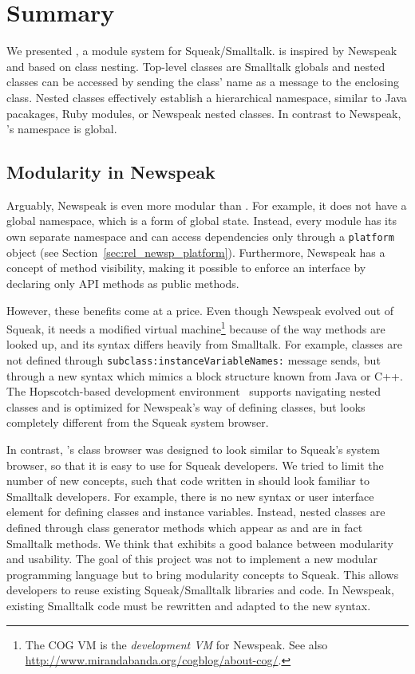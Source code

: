 \chapter{Summary}
\label{sec:summary}
We presented \msname, a module system for Squeak/Smalltalk. \msname is inspired by Newspeak and based on class nesting. Top-level classes are Smalltalk globals and nested classes can be accessed by sending the class' name as a message to the enclosing class. Nested classes effectively establish a hierarchical namespace, similar to Java pacakages, Ruby modules, or Newspeak nested classes. In contrast to Newspeak, \msname's namespace is global.

\section{Modularity in Newspeak}
Arguably, Newspeak is even more modular than \msname. For example, it does not have a global namespace, which is a form of global state. Instead, every module has its own separate namespace and can access dependencies only through a \texttt{platform} object (see Section~\ref{sec:rel_newsp_platform}). Furthermore, Newspeak has a concept of method visibility, making it possible to enforce an interface by declaring only API methods as public methods. 

However, these benefits come at a price. Even though Newspeak evolved out of Squeak, it needs a modified virtual machine\footnote{The COG VM is the \emph{development VM} for Newspeak. See also \url{http://www.mirandabanda.org/cogblog/about-cog/}.} because of the way methods are looked up, and its syntax differs heavily from Smalltalk. For example, classes are not defined through \texttt{subclass:instanceVariableNames:} message sends, but through a new syntax which mimics a block structure known from Java or C++. The Hopscotch-based development environment~\cite{Bykov08hopscotch:towards} supports navigating nested classes and is optimized for Newspeak's way of defining classes, but looks completely different from the Squeak system browser. 

In contrast, \msname's class browser was designed to look similar to Squeak's system browser, so that it is easy to use for Squeak developers. We tried to limit the number of new concepts, such that code written in \msname should look familiar to Smalltalk developers. For example, there is no new syntax or user interface element for defining classes and instance variables. Instead, nested classes are defined through class generator methods which appear as and are in fact Smalltalk methods. We think that \msname exhibits a good balance between modularity and usability. The goal of this project was not to implement a new modular programming language but to bring modularity concepts to Squeak. This allows developers to reuse existing Squeak/Smalltalk libraries and code. In Newspeak, existing Smalltalk code must be rewritten and adapted to the new syntax.

